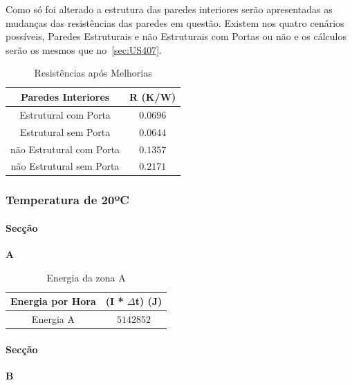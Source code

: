 \documentclass[12pt, a4paper]{article}
\begin{document}
Como só foi alterado a estrutura das paredes interiores serão apresentadas as mudanças das resistências das paredes em questão. Existem nos quatro cenários possíveis, Paredes Estruturais e não Estruturais com Portas ou não e os cálculos serão os mesmos que no~\ref{sec:US407}.

\begin{table}[htpb]
	\begin{center}
		\begin{tabular}{c c}
			\toprule
			Paredes Interiores  													 & 	R (K/W) \\
			\midrule
			Estrutural  com Porta 									&	$0.0696$		 \\
			Estrutural  sem Porta									&	$0.0644$		 \\
			n\~ao Estrutural com Porta							& $0.1357$		 \\
			n\~ao Estrutural sem Porta							& $0.2171$		 \\
			\bottomrule
		\end{tabular}
	\end{center}
	\caption{Resistências após Melhorias}\label{tab:melhoriasR}
\end{table}

\pagebreak
\subsubsection{Temperatura de 20ºC}

\paragraph{Secção}
\textbf{A}

\begin{table}[htpb]
	\begin{center}
		\begin{tabular}{c c}
			\toprule
			Energia por Hora 								 & 	(I * $\Delta$t) (J) \\
			\midrule
			Energia A 						               	     & $5142852$	 \\
			\bottomrule
		\end{tabular}
	\end{center}
	\caption{Energia da zona A}\label{tab:2seccaoApotT28}
\end{table}

\vspace{30mm}

\paragraph{Secção}
\textbf{B}
\end{document}
